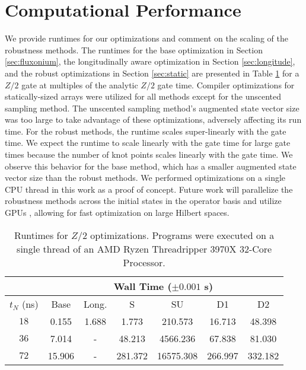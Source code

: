 \section{Computational Performance \label{appendix:time}}
We provide runtimes for our optimizations and comment on the scaling of the
robustness methods. The runtimes for
the base optimization in Section \ref{sec:fluxonium},
the longitudinally aware optimization in Section \ref{sec:longitude},
and the robust optimizations in Section \ref{sec:static}
are presented in Table \ref{tab:time}
for a $Z/2$ gate at multiples of the analytic $Z/2$ gate time.
Compiler optimizations for statically-sized arrays were utilized
for all methods except for the unscented sampling method.
The unscented sampling method's augmented state vector size
was too large to take advantage of these optimizations,
adversely affecting its run time.
For the robust methods, the runtime scales super-linearly with the
gate time. We expect the runtime to scale linearly with the gate time
for large gate times because
the number of knot points scales linearly with the gate time.
We observe this behavior for the base method, which has a smaller
augmented state vector size than the robust methods.
We performed optimizations on a single CPU thread in this work as a proof
of concept. Future work will parallelize the robustness
methods across the initial states in the operator basis and utilize GPUs
\cite{leung2017speedup},
allowing for fast optimization on large Hilbert spaces.

\begin{table}[ht!]
  \begin{tabular} {c | c | c | c | c | c | c}
    & \multicolumn{6}{c}{Wall Time ($\pm 0.001$ s)}\\
    \hline
    $t_{N}$ (ns) & Base & Long. & S & SU & D1 & D2\\
    \hline
    $18$ & 0.155 & 1.688 & 1.773 & 210.573 & 16.713 & 48.398\\ %
    $36$ & 7.014 & - & 48.213 & 4566.236 & 67.838 & 81.030\\
    $72$ & 15.906 & - & 281.372 & 16575.308 & 266.997 & 332.182\\
  \end{tabular}
  \caption{
    Runtimes for $Z/2$ optimizations.
    Programs were executed on a single thread of an
    AMD Ryzen Threadripper 3970X 32-Core Processor.
  }
  \label{tab:time}
\end{table}

